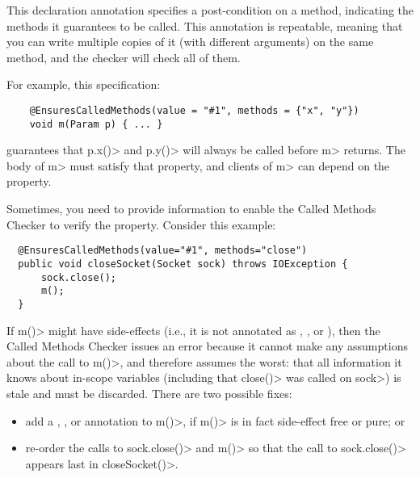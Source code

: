 \begin{description}
\label{called-methods-ensurescalledmethods}
\item[\refqualclass{checker/calledmethods/qual}{EnsuresCalledMethods}]
  This declaration annotation specifies a post-condition on a method, indicating the methods it
  guarantees to be called. This annotation is repeatable, meaning that you can write
  multiple copies of it (with different arguments) on the same method, and the checker will check all of them.

  For example, this specification:

  \begin{Verbatim}
    @EnsuresCalledMethods(value = "#1", methods = {"x", "y"})
    void m(Param p) { ... }
  \end{Verbatim}

  guarantees that \<p.x()> and \<p.y()> will always be called before \<m> returns.
  The body of \<m> must satisfy that property, and clients of \<m> can depend on the property.

  Sometimes, you need to provide information to enable the Called Methods
  Checker to verify the property.
  Consider this example:
  \begin{Verbatim}
  @EnsuresCalledMethods(value="#1", methods="close")
  public void closeSocket(Socket sock) throws IOException {
      sock.close();
      m();
  }
  \end{Verbatim}

  If \<m()> might have side-effects (i.e., it is not annotated as
  ,
  , or
  ),
  then the Called Methods Checker issues an error because
  it cannot make any assumptions about the call to \<m()>, and therefore assumes
  the worst: that all information it knows about in-scope variables (including
  that \<close()> was called on \<sock>) is stale and must be discarded.
  There are two possible fixes:

  \begin{itemize}
  \item add a ,
  , or
   annotation to \<m()>, if \<m()> is
    in fact side-effect free or pure; or
  \item re-order the calls to \<sock.close()> and \<m()> so that the call
    to \<sock.close()> appears last in \<closeSocket()>.
  \end{itemize}


\end{description}
